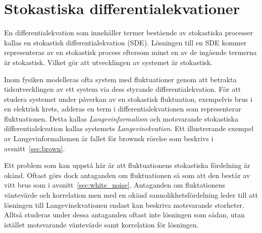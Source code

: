 


\section{Stokastiska differentialekvationer}
En differentialekvation som innehåller termer bestående av stokastiska
processer kallas en stokastisk differentialekvation (SDE). Lösningen
till en SDE kommer representeras av en stokastisk process eftersom
minst en av de ingående termerna är stokastisk. Vilket gör att utvecklingen av systemet är stokastisk.

Inom fysiken modelleras ofta system med fluktuationer genom
att betrakta tidsutvecklingen av ett system via dess styrande
differentialekvation. 
För att studera systemet under påverkan av en stokastisk fluktuation,
exempelvis brus i en elektrisk krets, adderas en term i
differentialekvationen som representerar fluktuationen. 
Detta kallas \emph{Langevinformalism} och motsvarande stokastiska
differentialekvation kallas systemets \emph{Langevinekvation}. 
Ett illustrerande exempel av Langevinformalismen är fallet för
brownsk rörelse som beskrivs i avsnitt~\ref{sec:brown}.

Ett problem som kan uppstå här är att fluktuationens stokastiska fördelning är okänd. Oftast görs dock antaganden om fluktuationen så som att den består av vitt brus som i avsnitt~\ref{sec:white_noise}. 
Antaganden om fluktationens väntevärde och korrelation men med en okänd sannolikhetsfördelning leder till att lösningen till Langevinekvationen endast kan beskriva motsvarande storheter. Alltså studeras under dessa antaganden oftast inte lösningen som sådan, utan istället motsvarande väntevärde samt korrelation för lösningen.  






